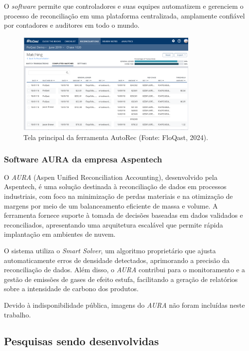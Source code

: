 O \textit{software} permite que controladores e suas equipes automatizem e gerenciem o processo de reconciliação em uma plataforma centralizada, amplamente confiável por contadores e auditores em todo o mundo.

\begin{figure}[htbp!]
	\centering
	\includegraphics[width=0.8\textwidth]{figuras/floqast-autorec.png}
	\caption{Tela principal da ferramenta AutoRec (Fonte: FloQast, 2024).}
	\label{fig:AutoRec}
\end{figure}

\subsubsection{Software AURA da empresa Aspentech}

O \textit{AURA} (Aspen Unified Reconciliation Accounting), desenvolvido pela Aspentech, é uma solução destinada à reconciliação de dados em processos industriais, com foco na minimização de perdas materiais e na otimização de margens por meio de um balanceamento eficiente de massa e volume. A ferramenta fornece suporte à tomada de decisões baseadas em dados validados e reconciliados, apresentando uma arquitetura escalável que permite rápida implantação em ambientes de nuvem.

O sistema utiliza o \textit{Smart Solver}, um algoritmo proprietário que ajusta automaticamente erros de densidade detectados, aprimorando a precisão da reconciliação de dados. Além disso, o \textit{AURA} contribui para o monitoramento e a gestão de emissões de gases de efeito estufa, facilitando a geração de relatórios sobre a intensidade de carbono dos produtos.

Devido à indisponibilidade pública, imagens do \textit{AURA} não foram incluídas neste trabalho.

\subsection{Pesquisas sendo desenvolvidas}

